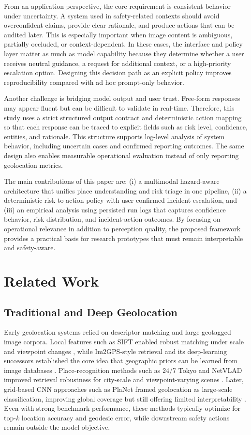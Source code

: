 \documentclass[12pt,a4paper]{article}
\begin{document}
From an application perspective, the core requirement is consistent behavior under uncertainty. A system used in safety-related contexts should avoid overconfident claims, provide clear rationale, and produce actions that can be audited later. This is especially important when image content is ambiguous, partially occluded, or context-dependent. In these cases, the interface and policy layer matter as much as model capability because they determine whether a user receives neutral guidance, a request for additional context, or a high-priority escalation option. Designing this decision path as an explicit policy improves reproducibility compared with ad hoc prompt-only behavior.

Another challenge is bridging model output and user trust. Free-form responses may appear fluent but can be difficult to validate in real-time. Therefore, this study uses a strict structured output contract and deterministic action mapping so that each response can be traced to explicit fields such as risk level, confidence, entities, and rationale. This structure supports log-level analysis of system behavior, including uncertain cases and confirmed reporting outcomes. The same design also enables measurable operational evaluation instead of only reporting geolocation metrics.

The main contributions of this paper are: (i) a multimodal hazard-aware architecture that unifies place understanding and risk triage in one pipeline, (ii) a deterministic risk-to-action policy with user-confirmed incident escalation, and (iii) an empirical analysis using persisted run logs that captures confidence behavior, risk distribution, and incident-action outcomes. By focusing on operational relevance in addition to perception quality, the proposed framework provides a practical basis for research prototypes that must remain interpretable and safety-aware.

\section{Related Work}

\subsection{Traditional and Deep Geolocation}
Early geolocation systems relied on descriptor matching and large geotagged image corpora. Local features such as SIFT enabled robust matching under scale and viewpoint changes \cite{lowe2004distinctive}, while Im2GPS-style retrieval and its deep-learning successors established the core idea that geographic priors can be learned from image databases \cite{wu2022im2city, vo2017revisiting}. Place-recognition methods such as 24/7 Tokyo and NetVLAD improved retrieval robustness for city-scale and viewpoint-varying scenes \cite{torii2015247, arandjelovic2016netvlad}. Later, grid-based CNN approaches such as PlaNet framed geolocation as large-scale classification, improving global coverage but still offering limited interpretability \cite{weyand2016planet}. Even with strong benchmark performance, these methods typically optimize for top-$k$ location accuracy and geodesic error, while downstream safety actions remain outside the model objective.
\end{document}
